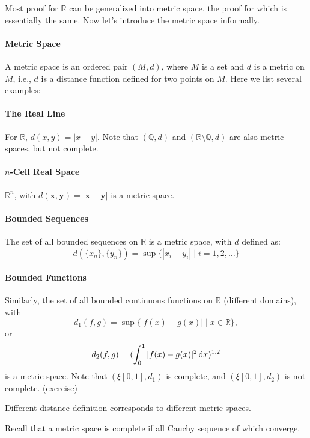 Most proof for $\mathbb{R}$ can be generalized into metric space, the proof for which is essentially the same. Now let's introduce the metric space informally.

\paragraph{Metric Space}
A metric space is an ordered pair $(M,d)$, where $M$ is a set and $d$ is a metric on $M$, i.e., $d$ is a distance function defined for two points on $M$. Here we list several examples:
\paragraph{The Real Line}
For $\mathbb{R}$, $d(x,y) = |x-y|$. 
Note that $(\mathbb{Q},d)$ and $(\mathbb{R}\setminus\mathbb{Q},d)$ are also metric spaces, but not complete.

\paragraph{$n$-Cell Real Space}
$\mathbb{R}^n$, with $d(\bm x,\bm y) = |\bm x - \bm y|$ is a metric space.

\paragraph{Bounded Sequences}
The set of all bounded sequences on $\mathbb{R}$ is a metric space, with $d$ defined as:
\[
d(\{x_n\},\{y_n\}) = \sup\{|x_i - y_i|\mid i=1,2,\dots\}
\]
\paragraph{Bounded Functions}
Similarly, the set of all bounded continuous functions on $\mathbb{R}$ (different domains), with 
\[
d_1(f,g) = \sup\{|f(x) - g(x)|\mid x\in\mathbb{R}\},
\] 
or 
\[
d_2(f,g) =( \int_0^1|f(x) - g(x)|^2\,\mathrm{d} x)^{1.2}
\]
is a metric space. Note that $(\xi[0,1],d_1)$ is complete, and $(\xi[0,1],d_2)$ is not complete. (exercise)
\begin{remark}

Different distance definition corresponds to different metric spaces.

Recall that a metric space is complete if all Cauchy sequence of which converge.
\end{remark}

